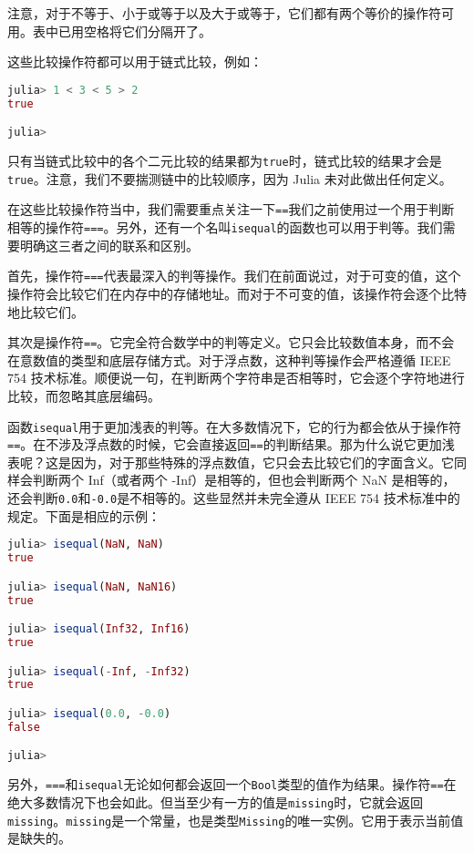 注意，对于不等于、小于或等于以及大于或等于，它们都有两个等价的操作符可用。表中已用空格将它们分隔开了。

这些比较操作符都可以用于链式比较，例如：
\begin{lstlisting}[language=julia]
julia> 1 < 3 < 5 > 2
true

julia> 
\end{lstlisting}

只有当链式比较中的各个二元比较的结果都为\verb|true|时，链式比较的结果才会是\verb|true|。注意，我们不要揣测链中的比较顺序，因为 Julia 未对此做出任何定义。

在这些比较操作符当中，我们需要重点关注一下\verb|==|我们之前使用过一个用于判断相等的操作符\verb|===|。另外，还有一个名叫\verb|isequal|的函数也可以用于判等。我们需要明确这三者之间的联系和区别。

首先，操作符\verb|===|代表最深入的判等操作。我们在前面说过，对于可变的值，这个操作符会比较它们在内存中的存储地址。而对于不可变的值，该操作符会逐个比特地比较它们。

其次是操作符\verb|==|。它完全符合数学中的判等定义。它只会比较数值本身，而不会在意数值的类型和底层存储方式。对于浮点数，这种判等操作会严格遵循 IEEE 754 技术标准。顺便说一句，在判断两个字符串是否相等时，它会逐个字符地进行比较，而忽略其底层编码。

函数\verb|isequal|用于更加浅表的判等。在大多数情况下，它的行为都会依从于操作符\verb|==|。在不涉及浮点数的时候，它会直接返回\verb|==|的判断结果。那为什么说它更加浅表呢？这是因为，对于那些特殊的浮点数值，它只会去比较它们的字面含义。它同样会判断两个 Inf（或者两个 -Inf）是相等的，但也会判断两个 NaN 是相等的，还会判断\verb|0.0|和\verb|-0.0|是不相等的。这些显然并未完全遵从 IEEE 754 技术标准中的规定。下面是相应的示例：
\begin{lstlisting}[language=julia]
julia> isequal(NaN, NaN)
true

julia> isequal(NaN, NaN16)
true

julia> isequal(Inf32, Inf16)
true

julia> isequal(-Inf, -Inf32)
true

julia> isequal(0.0, -0.0)
false

julia> 
\end{lstlisting}

另外，\verb|===|和\verb|isequal|无论如何都会返回一个\verb|Bool|类型的值作为结果。操作符\verb|==|在绝大多数情况下也会如此。但当至少有一方的值是\verb|missing|时，它就会返回\verb|missing|。\verb|missing|是一个常量，也是类型\verb|Missing|的唯一实例。它用于表示当前值是缺失的。

